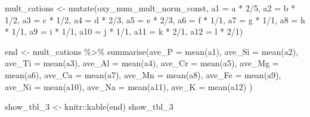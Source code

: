 \documentclass[
]{article}
\newenvironment{Shaded}{\begin{snugshade}}{\end{snugshade}}
\newcommand{\AttributeTok}[1]{\textcolor[rgb]{0.77,0.63,0.00}{#1}}
\newcommand{\DecValTok}[1]{\textcolor[rgb]{0.00,0.00,0.81}{#1}}
\newcommand{\FunctionTok}[1]{\textcolor[rgb]{0.00,0.00,0.00}{#1}}
\newcommand{\NormalTok}[1]{#1}
\newcommand{\OtherTok}[1]{\textcolor[rgb]{0.56,0.35,0.01}{#1}}
\newcommand{\SpecialCharTok}[1]{\textcolor[rgb]{0.00,0.00,0.00}{#1}}
\begin{document}
\begin{Shaded}
\begin{Highlighting}[]
\NormalTok{mult\_cations }\OtherTok{\textless{}{-}} \FunctionTok{mutate}\NormalTok{(oxy\_num\_mult\_norm\_const, }\AttributeTok{a1 =}\NormalTok{ a }\SpecialCharTok{*} \DecValTok{2}\SpecialCharTok{/}\DecValTok{5}\NormalTok{,}
                       \AttributeTok{a2 =}\NormalTok{ b }\SpecialCharTok{*} \DecValTok{1}\SpecialCharTok{/}\DecValTok{2}\NormalTok{,}
                       \AttributeTok{a3 =}\NormalTok{ c }\SpecialCharTok{*} \DecValTok{1}\SpecialCharTok{/}\DecValTok{2}\NormalTok{,}
                       \AttributeTok{a4 =}\NormalTok{ d }\SpecialCharTok{*} \DecValTok{2}\SpecialCharTok{/}\DecValTok{3}\NormalTok{,}
                       \AttributeTok{a5 =}\NormalTok{ e }\SpecialCharTok{*} \DecValTok{2}\SpecialCharTok{/}\DecValTok{3}\NormalTok{,}
                       \AttributeTok{a6 =}\NormalTok{ f }\SpecialCharTok{*} \DecValTok{1}\SpecialCharTok{/}\DecValTok{1}\NormalTok{,}
                       \AttributeTok{a7 =}\NormalTok{ g }\SpecialCharTok{*} \DecValTok{1}\SpecialCharTok{/}\DecValTok{1}\NormalTok{,}
                       \AttributeTok{a8 =}\NormalTok{ h }\SpecialCharTok{*} \DecValTok{1}\SpecialCharTok{/}\DecValTok{1}\NormalTok{,}
                       \AttributeTok{a9 =}\NormalTok{ i }\SpecialCharTok{*} \DecValTok{1}\SpecialCharTok{/}\DecValTok{1}\NormalTok{,}
                       \AttributeTok{a10 =}\NormalTok{ j }\SpecialCharTok{*} \DecValTok{1}\SpecialCharTok{/}\DecValTok{1}\NormalTok{,}
                       \AttributeTok{a11 =}\NormalTok{ k }\SpecialCharTok{*} \DecValTok{2}\SpecialCharTok{/}\DecValTok{1}\NormalTok{,}
                       \AttributeTok{a12 =}\NormalTok{ l }\SpecialCharTok{*} \DecValTok{2}\SpecialCharTok{/}\DecValTok{1}\NormalTok{)}

\NormalTok{end }\OtherTok{\textless{}{-}}\NormalTok{ mult\_cations }\SpecialCharTok{\%\textgreater{}\%} 
  \FunctionTok{summarise}\NormalTok{(}\AttributeTok{ave\_P =} \FunctionTok{mean}\NormalTok{(a1),}
            \AttributeTok{ave\_Si =} \FunctionTok{mean}\NormalTok{(a2),}
            \AttributeTok{ave\_Ti =} \FunctionTok{mean}\NormalTok{(a3),}
            \AttributeTok{ave\_Al =} \FunctionTok{mean}\NormalTok{(a4),}
            \AttributeTok{ave\_Cr =} \FunctionTok{mean}\NormalTok{(a5),}
            \AttributeTok{ave\_Mg =} \FunctionTok{mean}\NormalTok{(a6),}
            \AttributeTok{ave\_Ca =} \FunctionTok{mean}\NormalTok{(a7),}
            \AttributeTok{ave\_Mn =} \FunctionTok{mean}\NormalTok{(a8),}
            \AttributeTok{ave\_Fe =} \FunctionTok{mean}\NormalTok{(a9),}
            \AttributeTok{ave\_Ni =} \FunctionTok{mean}\NormalTok{(a10),}
            \AttributeTok{ave\_Na =} \FunctionTok{mean}\NormalTok{(a11),}
            \AttributeTok{ave\_K =} \FunctionTok{mean}\NormalTok{(a12) }
\NormalTok{            )}

\NormalTok{show\_tbl\_3 }\OtherTok{\textless{}{-}}\NormalTok{ knitr}\SpecialCharTok{::}\FunctionTok{kable}\NormalTok{(end)}
\NormalTok{show\_tbl\_3}
\end{Highlighting}
\end{Shaded}
\end{document}
